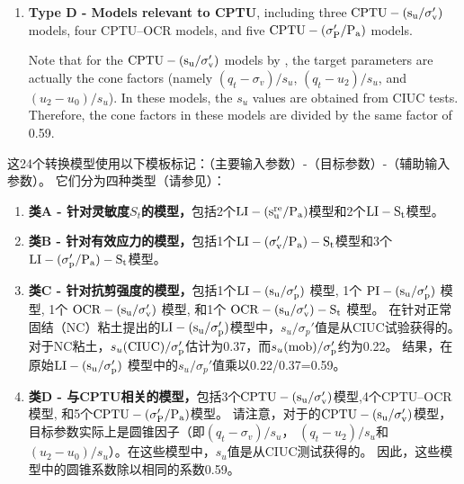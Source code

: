 \begin{paracol}{2}
\begin{enumerate}
        \item \textbf{Type D - Models relevant to CPTU}, including three $\rm{CPTU}-(s_u/\sigma_v')$ models, four CPTU–OCR models, \quad and five $\rm{CPTU-(\sigma_P'/P_a)}$ models. 
        
        Note that for the $\rm{CPTU}-(s_u/\sigma_v')$ models by \citet{Ching201252}, the target parameters are actually the cone factors (namely $(q_t-\sigma_v)/s_u$, $(q_t-u_2)/s_u$, and $(u_2-u_0)/s_u$). In these models, the $s_u$ values are obtained from CIUC tests. Therefore, the cone factors in these models are divided by the same factor of 0.59.
    \end{enumerate}

    \switchcolumn
        
    这24个转换模型使用以下模板标记：（主要输入参数）-（目标参数）-（辅助输入参数）。 它们分为四种类型（请参见）：
    \begin{enumerate}
        \item \textbf{类A - 针对灵敏度$S_t$的模型，}包括2个$\rm{LI}-(s_u^{re}/P_a)$模型和2个$\rm{LI}-S_t$模型。

        \item \textbf{类B - 针对有效应力的模型，}包括1个$\rm{LI}-(\sigma_v'/P_a)-S_t$模型和3个$\rm{LI}-(\sigma_p'/P_a)-S_t$模型。

        \item \textbf{类C - 针对抗剪强度的模型，}包括1个$\rm{LI}-(s_u/\sigma_p')$ 模型, 1个 $\rm{PI}-(s_u/\sigma_p')$ 模型, 1个 $\rm{OCR}-(s_u/\sigma_v')$ 模型, 和1个 $\rm{OCR}-(s_u/\sigma_v')-S_t$ 模型。
        在\citet{Bjerrum1960711}针对正常固结（NC）粘土提出的$\rm{LI}-(s_u/\sigma_p')$模型中，$s_u/\sigma_p'$值是从CIUC试验获得的。 对于NC粘土，$s_u(\rm{CIUC})/\sigma_p'$估计为0.37，而$s_u(\rm{mob})/\sigma_p'$约为0.22\citep{Mesri1975409}。 结果，\citet{Bjerrum1960711}在原始$\rm{LI}-(s_u/\sigma_p')$ 模型中的$s_u/\sigma_p'$值乘以0.22/0.37=0.59。

        \item \textbf{类D - 与CPTU相关的模型，}包括3个$\rm{CPTU}-(s_u/\sigma_v')$模型,4个CPTU–OCR模型, 和5个$\rm{CPTU-(\sigma_P'/P_a)}$模型。
        请注意，对于\citet{Ching201252}的$\rm{CPTU}-(s_u/\sigma_v')$模型，目标参数实际上是圆锥因子（即$(q_t-\sigma_v)/s_u$， $(q_t-u_2)/s_u$和 $(u_2-u_0)/s_u$）。在这些模型中，$s_u$值是从CIUC测试获得的。 因此，这些模型中的圆锥系数除以相同的系数0.59。
    \end{enumerate}

    \switchcolumn*
        

\end{paracol}
